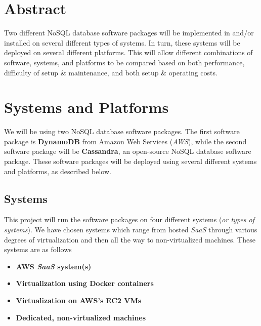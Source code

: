 \documentclass{article}[12pt]
\numberwithin{equation}{section}
\begin{document}
\begin{multicols*}{2}


\section*{Abstract}
\begin{spacing}{1.5}
Two different NoSQL database software  packages will be implemented in and/or  installed on several different types of  systems. In turn, these systems will  be deployed on several different  platforms. This will allow different  combinations of software, systems,  and platforms to be compared based  on both performance, difficulty of setup  \& maintenance, and both setup \& operating costs.
\end{spacing}





\section{Systems and Platforms}
\begin{spacing}{1.5}
We will be using two NoSQL database software packages.  The first software package is \textbf{DynamoDB} from Amazon Web Services (\emph{AWS}), while the second software package will be \textbf{Cassandra}, an open-source NoSQL database software package.  These software packages will be deployed using several different systems and platforms, as described below.
\end{spacing}



\subsection{Systems}
\begin{spacing}{1.5}
This project will run the software packages on four different systems (\emph{or types of systems}).  We have chosen systems which range from hosted \emph{SaaS} through various degrees of virtualization and then all the way to non-virtualized machines.  These systems are as follows

\begin{itemize}
	\item \textbf{AWS \emph{SaaS} system(s)}
	\item \textbf{Virtualization using Docker containers}
	\item \textbf{Virtualization on AWS's EC2 VMs}
	\item \textbf{Dedicated, non-virtualized machines}
\end{itemize}


\end{spacing}
\end{multicols*}
\end{document}
